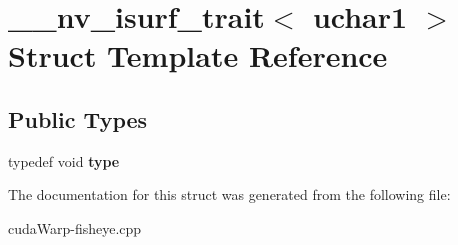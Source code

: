 \hypertarget{struct____nv__isurf__trait_3_01uchar1_01_4}{}\section{\+\_\+\+\_\+nv\+\_\+isurf\+\_\+trait$<$ uchar1 $>$ Struct Template Reference}
\label{struct____nv__isurf__trait_3_01uchar1_01_4}
\subsection*{Public Types}
\begin{DoxyCompactItemize}
\item 
typedef void {\bfseries type}\hypertarget{struct____nv__isurf__trait_3_01uchar1_01_4_a266fae9525f024d0bfb0b47586df4e46}{}\label{struct____nv__isurf__trait_3_01uchar1_01_4_a266fae9525f024d0bfb0b47586df4e46}

\end{DoxyCompactItemize}


The documentation for this struct was generated from the following file\+:\begin{DoxyCompactItemize}
\item 
cuda\+Warp-\/fisheye.\+cpp\end{DoxyCompactItemize}
